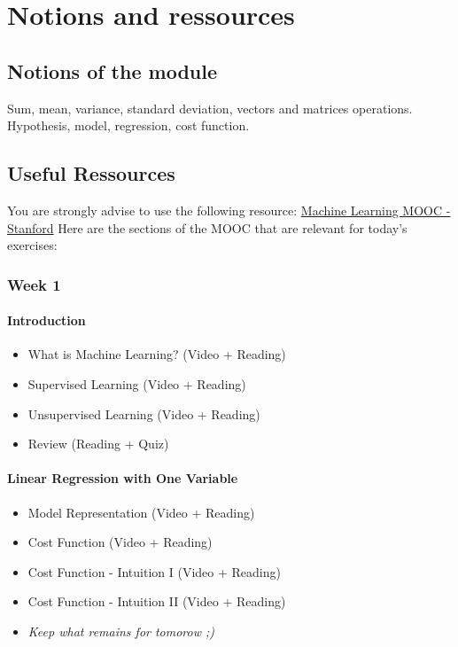 

\chapter*{Notions and ressources}

\section*{Notions of the module}
Sum, mean, variance, standard deviation, vectors and matrices operations.  
Hypothesis, model, regression, cost function. 

\section*{Useful Ressources}

You are strongly advise to use the following resource:
\href{https://www.coursera.org/learn/machine-learning/home/week/1}{Machine Learning MOOC - Stanford}
Here are the sections of the MOOC that are relevant for today's exercises: 

\subsection*{Week 1}

\subsubsection*{Introduction}
\begin{itemize}
  \item What is Machine Learning? (Video + Reading)
  \item Supervised Learning (Video + Reading)
  \item Unsupervised Learning (Video + Reading)
  \item Review (Reading + Quiz)
\end{itemize}
    
\subsubsection*{Linear Regression with One Variable}  
\begin{itemize}
  \item Model Representation (Video + Reading)
  \item Cost Function (Video + Reading)
  \item Cost Function - Intuition I (Video + Reading)
  \item Cost Function - Intuition II (Video + Reading)
  \item \textit{Keep what remains for tomorow ;)}
\end{itemize}

